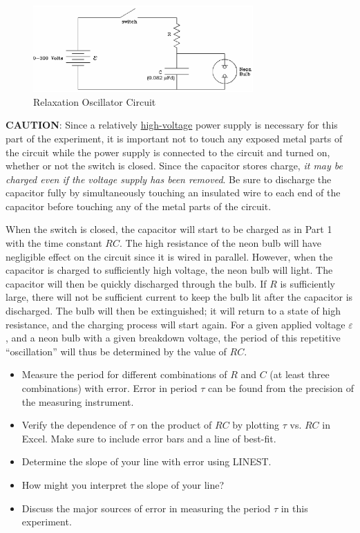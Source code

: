 \begin{figure}[h]
   \begin{center}
       \includegraphics[width=0.75\textwidth]{./Exp3/pic/image8.png}
   \end{center}
   \caption{Relaxation Oscillator Circuit}
   \label{fig:relaxcirc}
\end{figure}

\textbf{CAUTION}: Since a relatively \underline{high-voltage} power supply is necessary for this part of the experiment, it is important not to touch any exposed metal parts of the circuit while the power supply is connected to the circuit and turned on, whether or not the switch is closed. Since the capacitor stores charge, \emph{it may be charged even if the voltage supply has been removed}. Be sure to discharge the capacitor fully by simultaneously touching an insulated wire to each end of the capacitor before touching any of the metal parts of the circuit.\myskip

When the switch is closed, the capacitor will start to be charged as in Part 1 with the time constant $RC$. The high resistance  of the neon bulb will have negligible effect on the circuit since it is wired in parallel. However, when the capacitor is charged to sufficiently high voltage, the neon bulb will light. The capacitor will then be quickly discharged through the bulb. If $R$ is sufficiently large, there will not be sufficient current to keep the bulb lit after the capacitor is discharged. The bulb will then be extinguished; it will return to a state of high resistance, and the charging process will start again. For a given applied voltage $\varepsilon$, and a neon bulb with a given breakdown voltage, the period of this repetitive ``oscillation'' will thus be determined by the value of $RC$.\myskip
\begin{itemize}
  \item Measure the period for different combinations of $R$ and $C$ (at least three combinations) with error. Error in period $\tau$ can be found from the precision of the measuring instrument.
  \item Verify the dependence of $\tau$ on the product of $RC$ by plotting $\tau$ vs. $RC$ in Excel. Make sure to include error bars and a line of best-fit.
  \item Determine the slope of your line with error using LINEST.
  \item How might you interpret the slope of your line?
  \item Discuss the major sources of error in measuring the period $\tau$ in this experiment.
\end{itemize}
